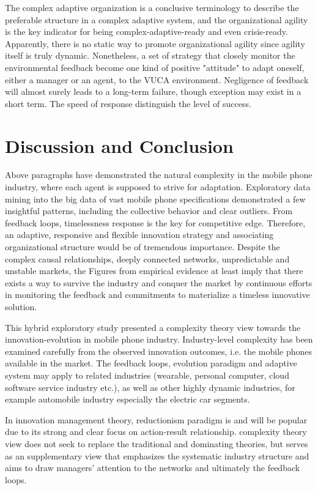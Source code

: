 \documentclass[utf8,english]{gradu3}
\begin{document}
The complex adaptive organization is a conclusive terminology to describe the preferable structure in a complex adaptive system, and the organizational agility is the key indicator for being complex-adaptive-ready and even crisis-ready. Apparently, there is no static way to promote organizational agility since agility itself is truly dynamic. Nonetheless, a set of strategy that closely monitor the environmental feedback become one kind of positive "attitude" to adapt oneself, either a manager or an agent, to the VUCA environment. Negligence of feedback will almost surely leads to a long-term failure, though exception may exist in a short term. The speed of response distinguish the level of success.

\chapter{Discussion and Conclusion}

Above paragraphs have demonstrated the natural complexity in the mobile phone industry, where each agent is supposed to strive for adaptation. Exploratory data mining into the big data of vast mobile phone specifications demonstrated a few insightful patterns, including the collective behavior and clear outliers. From feedback loops, timelessness response is the key for competitive edge. Therefore, an adaptive, responsive and flexible innovation strategy and associating organizational structure would be of tremendous importance. Despite the complex causal relationships, deeply connected networks, unpredictable and unstable markets, the Figures from empirical evidence at least imply that there exists a way to survive the industry and conquer the market by continuous efforts in monitoring the feedback and commitments to materialize a timeless innovative solution. 

This hybrid exploratory study presented a complexity theory view towards the innovation-evolution in mobile phone industry. Industry-level complexity has been examined carefully from the observed innovation outcomes, i.e. the mobile phones available in the market. The feedback loops, evolution paradigm and adaptive system may apply to related industries (wearable, personal computer, cloud software service industry etc.), as well as other highly dynamic industries, for example automobile industry especially the electric car segments. 

In innovation management theory, reductionism paradigm is and will be popular due to its strong and clear focus on action-result relationship. complexity theory view does not seek to replace the traditional and dominating theories, but serves as an supplementary view that emphasizes the systematic industry structure and aims to draw managers' attention to the networks and ultimately the feedback loops.
\end{document}
